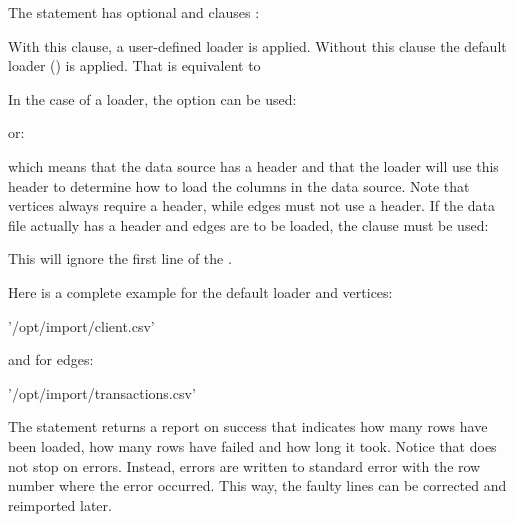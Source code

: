 The  statement has optional  and  clauses
:

 

With this clause, a user-defined loader is applied.
Without this clause the default loader ()
is applied. That is equivalent to

 

In the case of a  loader,
the  option can be used:


or:


which means that the data source has a header and that the loader
will use this header to determine how to load the columns in the data source.
Note that vertices always require a header, while edges
must not use a header. If the data file actually has a header
and edges are to be loaded, the  clause must be used:


This will ignore the first line of the .

Here is a complete example for the default loader and vertices:

 '/opt/import/client.csv'
  


and for edges:

 '/opt/import/transactions.csv'
 


The  statement returns a report on success
that indicates how many rows have been loaded,
how many rows have failed and how long it took.
Notice that  does not stop on errors.
Instead, errors are written to standard error
with the row number where the error occurred.
This way, the faulty lines can be corrected and
reimported later. 

